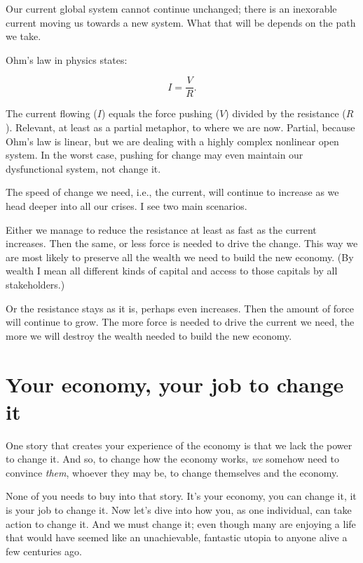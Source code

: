 Our current global system cannot continue unchanged; there is an inexorable current moving us towards a new system. What that will be depends on the path we take. 


Ohm's law in physics states:


\begin{equation}
        I = \frac{V}{R}.
\end{equation}


The current flowing ($I$) equals the force pushing ($V$) divided by the resistance ($R$). Relevant, at least as a partial metaphor, to where we are now. Partial, because Ohm's law is linear, but we are dealing with a highly complex nonlinear open system. In the worst case, pushing for change may even maintain our dysfunctional system, not change it.


The speed of change we need, i.e., the current, will continue to increase as we head deeper into all our crises. I see two main scenarios. 


Either we manage to reduce the resistance at least as fast as the current increases. Then the same, or less force is needed to drive the change. This way we are most likely to preserve all the wealth we need to build the new economy. (By wealth I mean all different kinds of capital and access to those capitals by all stakeholders.)


Or the resistance stays as it is, perhaps even increases. Then the amount of force will continue to grow. The more force is needed to drive the current we need, the more we will destroy the wealth needed to build the new economy. 


\section{Your economy, your job to change it}
One story that creates your experience of the economy is that we lack the power to change it. And so, to change how the economy works, \emph{we} somehow need to convince \emph{them}, whoever they may be, to change themselves and the economy.


None of you needs to buy into that story. It's your economy, you can change it, it is your job to change it. Now let's dive into how you, as one individual, can take action to change it. And we must change it; even though many are enjoying a life that would have seemed like an unachievable, fantastic utopia to anyone alive a few centuries ago.


